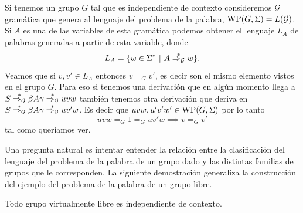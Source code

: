 \documentclass[tesis.tex]{subfiles}
\begin{document}
\begin{obs}\label{palabras-wp}
	Si tenemos un grupo $G$ tal que es independiente de contexto consideremos $\cal G$ gramática que genera al lenguaje del problema de la palabra, $\text{WP}(G, \Sigma) = L(\cal G)$.
	Si $A$ es una de las variables de esta gramática podemos obtener el lenguaje $L_A$ de palabras generadas a partir de esta variable, donde
	\[
	L_A = \{ w \in \Sigma^*  \ | \ A \overset{*}{\Rightarrow_{\cal G}} w  \}.
	\]
	Veamos que si $v,v' \in L_A$ entonces $v =_G v'$, es decir son el mismo elemento vistos en el grupo $G$. 
	Para eso si tenemos una derivación que en algún momento llega a $S \overset{*}{\Rightarrow_{\cal G}} \beta A \gamma \overset{*}{\Rightarrow_{\cal G}} uvw$ también tenemos otra derivación que deriva en $S \overset{*}{\Rightarrow_{\cal G}} \beta A \gamma  \overset{*}{\Rightarrow_{\cal G}} uv'w$. 
	Es decir que $uvw, u'v'w' \in \text{WP}(G, \Sigma)$ por lo tanto 
	\begin{equation*}
		uvw =_G 1 =_G uv'w \implies v =_G v'
	\end{equation*}
	tal como queríamos ver.
\end{obs}



Una pregunta natural es intentar entender la relación entre la clasificación del lenguaje del problema de la palabra de un grupo dado y las distintas familias de grupos que le corresponden. 
La siguiente demostración generaliza la construcción del ejemplo del problema de la palabra de un grupo libre.


\begin{teo}\cite{muller1983groups}
	Todo grupo virtualmente libre es independiente de contexto.
\end{teo}
\end{document}
